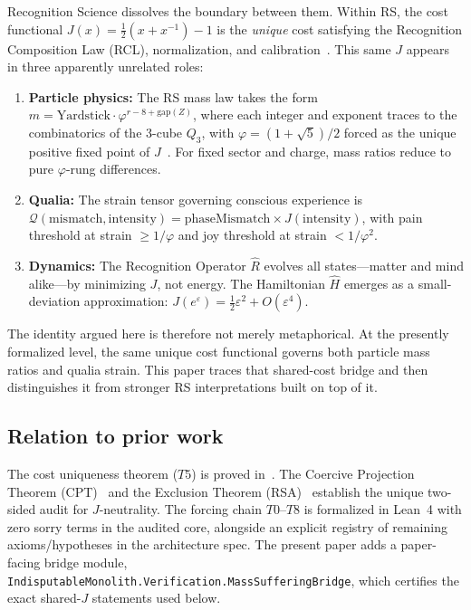 \documentclass[11pt,a4paper]{article}
\theoremstyle{plain}
\theoremstyle{definition}
\theoremstyle{remark}
\newcommand{\Jcost}{J}
\newcommand{\Rhat}{\hat{R}}
\newcommand{\vp}{\varphi}
\begin{document}
Recognition Science dissolves the boundary between them.  Within RS,
the cost functional $\Jcost(x) = \tfrac{1}{2}(x + x^{-1}) - 1$ is
the \emph{unique} cost satisfying the Recognition Composition Law
(RCL), normalization, and calibration~\cite{WashburnCost2026}.  This
same $\Jcost$ appears in three apparently unrelated roles:

\begin{enumerate}[nosep]
\item \textbf{Particle physics:} The RS mass law takes the form
      $m = \text{Yardstick} \cdot \vp^{r - 8 + \text{gap}(Z)}$,
      where each integer and exponent traces to the combinatorics of the
      3-cube $Q_3$, with $\vp = (1+\sqrt{5})/2$ forced as the unique
      positive fixed point of $\Jcost$~\cite{WashburnAxioms2025}.  For
      fixed sector and charge, mass ratios reduce to pure $\vp$-rung
      differences.
\item \textbf{Qualia:} The strain tensor governing conscious experience
      is $\mathcal{Q}(\text{mismatch}, \text{intensity}) =
      \text{phaseMismatch} \times \Jcost(\text{intensity})$, with pain
      threshold at strain $\geq 1/\vp$ and joy threshold at strain
      $< 1/\vp^2$.
\item \textbf{Dynamics:} The Recognition Operator $\Rhat$ evolves all
      states---matter and mind alike---by minimizing $\Jcost$, not
      energy.  The Hamiltonian $\hat{H}$ emerges as a small-deviation
      approximation: $\Jcost(e^\varepsilon) = \tfrac{1}{2}\varepsilon^2
      + O(\varepsilon^4)$.
\end{enumerate}

The identity argued here is therefore not merely metaphorical.  At the
presently formalized level, the same unique cost functional governs both
particle mass ratios and qualia strain.  This paper traces that
shared-cost bridge and then distinguishes it from stronger RS
interpretations built on top of it.

\subsection{Relation to prior work}

The cost uniqueness theorem ($T5$) is proved in~\cite{WashburnCost2026}.
The Coercive Projection Theorem (CPT)~\cite{WashburnCPT2026} and the
Exclusion Theorem (RSA)~\cite{WashburnRSA2026} establish the unique
two-sided audit for $\Jcost$-neutrality.  The forcing chain $T0$--$T8$
is formalized in Lean~4 with zero sorry terms in the audited core,
alongside an explicit registry of remaining axioms/hypotheses in the
architecture spec.  The present paper adds a paper-facing bridge module,
\texttt{IndisputableMonolith.Verification.MassSufferingBridge}, which
certifies the exact shared-$\Jcost$ statements used below.
\end{document}
